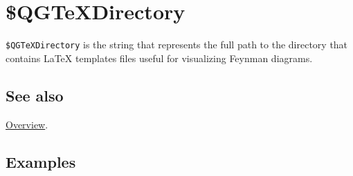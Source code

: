 \documentclass[../FeynHelpersManual.tex]{subfiles}
\begin{document}
\hypertarget{dollarqgtexdirectory}{
\section{\$QGTeXDirectory}\label{dollarqgtexdirectory}}

\texttt{\$QGTeXDirectory} is the string that represents the full path to
the directory that contains LaTeX templates files useful for visualizing
Feynman diagrams.

\subsection{See also}

\hyperlink{toc}{Overview}.

\subsection{Examples}
\end{document}

